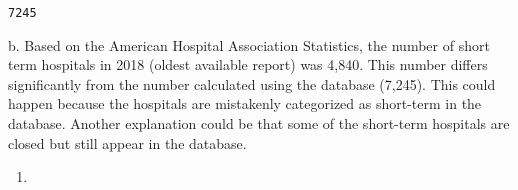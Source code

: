 \documentclass[
  letterpaper,
  DIV=11,
  numbers=noendperiod]{scrartcl}
\providecommand{\tightlist}{%
  \setlength{\itemsep}{0pt}\setlength{\parskip}{0pt}}\usepackage{longtable,booktabs,array}
\begin{document}
\begin{verbatim}
7245
\end{verbatim}

\hfill\break
b. Based on the American Hospital Association Statistics, the number of
short term hospitals in 2018 (oldest available report) was 4,840. This
number differs significantly from the number calculated using the
database (7,245). This could happen because the hospitals are mistakenly
categorized as short-term in the database. Another explanation could be
that some of the short-term hospitals are closed but still appear in the
database.

\begin{enumerate}
\def\labelenumi{\arabic{enumi}.}
\setcounter{enumi}{2}
\tightlist
\item
\end{enumerate}
\end{document}
